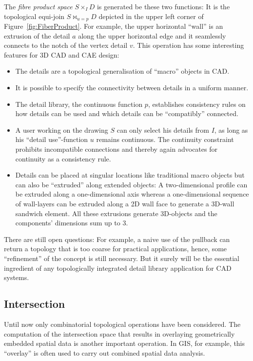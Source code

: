 \documentclass[5p]{elsarticle}
\newcommand{\qq}[1]{``#1''}
\begin{document}
The \emph{fibre product space} $S \times_I D$ is generated be these two functions: 
It is the topological equi-join $S\Join_{u=p} D$ depicted in the upper 
left corner of Figure~\ref{fig:FiberProduct}. For example, the upper horizontal \qq{wall} is 
an extrusion of the detail $a$ along the upper horizontal edge and it seamlessly connects 
to the notch of the vertex detail $v$. 
This operation has some interesting features for 3D CAD and CAE design: 
\begin{itemize}
\item The details are a topological generalisation of \qq{macro} objects in CAD. 
\item It is possible to specify the connectivity between details in a uniform manner. 
\item The detail library, the continuous function $p$, establishes consistency rules on how 
      details can be used and which details can be \qq{compatibly} connected. 
\item A user working on the drawing $S$ can only select his details from $I$, as long as his 
      \qq{detail use}-function $u$ remains continuous. The continuity constraint prohibits 
      incompatible connections and thereby again advocates for continuity as a consistency rule. 
\item Details can be placed at singular locations like traditional macro objects but can also be 
      \qq{extruded} along extended objects: 
      A two-dimensional profile can be extruded along a one-dimensional axis whereas a 
      one-dimensional sequence of wall-layers can be extruded along a 2D wall 
      face to generate a 3D-wall sandwich element. All these extrusions generate 3D-objects 
      and the components' dimensions sum up to 3. 
\end{itemize}

There are still open questions: For example, a naive use of the pullback can return a topology 
that is too coarse for practical applications, hence, some \qq{refinement} of the concept is still 
necessary. But it surely will be the essential ingredient of any topologically integrated detail 
library application for CAD systems. 


\subsection{Intersection} 

Until now only combinatorial topological operations have been considered. 
The computation of the intersection space that results in overlaying 
geometrically embedded spatial data is another important operation. 
In GIS, for example, this \qq{overlay} is often used to carry out combined spatial 
data analysis. 
\end{document}
